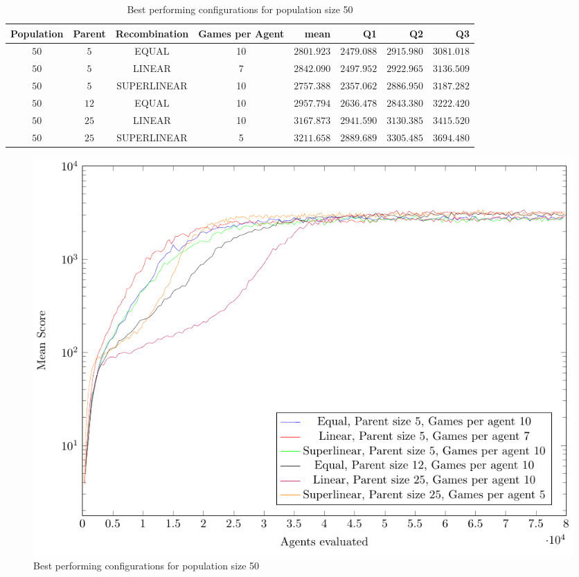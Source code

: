 \begin{table}[H]
\centering
\small
\begin{tabular}{c c c c r r r r}
Population & Parent & Recombination & Games per Agent & mean & Q1 & Q2 & Q3\\
\hline
$50$ & $5$ & EQUAL & 10 & $2801.923$ & $2479.088$ & $2915.980$ & $3081.018$\\
$50$ & $5$ & LINEAR & 7 & $2842.090$ & $2497.952$ & $2922.965$ & $3136.509$\\
$50$ & $5$ & SUPERLINEAR & 10 & $2757.388$ & $2357.062$ & $2886.950$ & $3187.282$\\
$50$ & $12$ & EQUAL & 10 & $2957.794$ & $2636.478$ & $2843.380$ & $3222.420$\\
$50$ & $25$ & LINEAR & 10 & $3167.873$ & $2941.590$ & $3130.385$ & $3415.520$\\
$50$ & $25$ & SUPERLINEAR & 5 & $3211.658$ & $2889.689$ & $3305.485$ & $3694.480$\\
\end{tabular}
\caption{Best performing configurations for population size 50}
\end{table}

\begin{figure}[H]
\centering
\caption{Best performing configurations for population size 50}
\includegraphics[scale=1]{data/cma_population_offspring/bestofeach_population/50x/PlotFile.pdf}
\end{figure}

\clearpage

